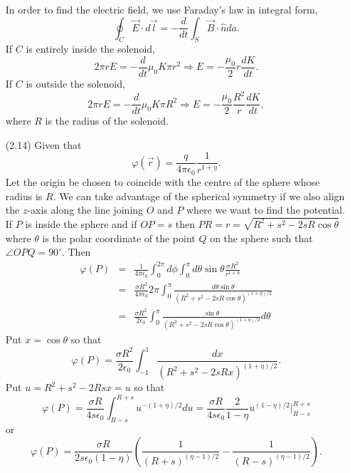\documentclass{article}
\newcommand{\un}{\hat{n}}
\begin{document}
\begin{enumerate}
In order to find the electric field, we use Faraday's law in integral form,
\[
\oint_C \vec{E}\cdot d\vec{l} = -\frac{d}{dt}\int_S \vec{B}\cdot\un da.
\]
If $C$ is entirely inside the solenoid, 
\[
2\pi r E = -\frac{d}{dt}\mu_0 K \pi r^2 \Rightarrow E = -\frac{\mu_0}{2}r \frac{dK}{dt}.
\]
If $C$ is outside the solenoid,
\[
2\pi r E = -\frac{d}{dt}\mu_0 K \pi R^2 \Rightarrow E = -\frac{\mu_0}{2}\frac{R^2}{r} \frac{dK}{dt},
\]
where $R$ is the radius of the solenoid.

\item[(2.14)] Given that
\[
\varphi(\vec{r}) = \frac{q}{4\pi\epsilon_0}\frac{1}{r^{1+\eta}}.
\]
Let the origin be chosen to coincide with the centre of the sphere whose radius is $R$. We can take advantage of the
spherical symmetry if we also align the $z$-axis along the line joining $O$ and $P$ where we want to find the potential. If $P$
is inside the sphere and if $OP = s$ then $PR = r = \sqrt{R^2 + s^2 - 2sR\cos\theta}$ where $\theta$ is the polar coordinate of
the point $Q$ on the sphere such that $\angle OPQ = 90^\circ$. Then
\begin{eqnarray*}
\varphi(P) &=& \frac{1}{4\pi\epsilon_0}\int_0^{2\pi}d\phi \int_0^\pi d\theta \sin\theta\frac{\sigma R^2}{r^{1+\eta}} \\
 &=& \frac{\sigma R^2}{4\pi\epsilon_0} 2\pi \int_0^\pi \frac{d\theta \sin\theta}{(R^2 + s^2 - 2sR\cos\theta)^{(1 + \eta)/2}} \\
 &=& \frac{\sigma R^2}{2\epsilon_0} \int_0^\pi \frac{\sin\theta}{(R^2 + s^2 - 2sR\cos\theta)^{(1 + \eta)/2}}d\theta
\end{eqnarray*}
Put $x = \cos\theta$ so that
\[
\varphi(P) = \frac{\sigma R^2}{2\epsilon_0}\int_{-1}^1 \frac{dx}{(R^2 + s^2 - 2sRx)^{(1 + \eta)/2}}.
\]
Put $u = R^2 + s^2 - 2Rsx = u$ so that
\[
\varphi(P) = \frac{\sigma R}{4s\epsilon_0}\int_{R-s}^{R+s} u^{-(1 + \eta)/2}du = \frac{\sigma R}{4s\epsilon_0}\frac{2}{1 - \eta}
u^{(1 - \eta)/2}\Big|_{R-s}^{R+s}
\]
or
\[
\varphi(P) = \frac{\sigma R}{2s\epsilon_0(1 - \eta)}\left(\frac{1}{(R+s)^{(\eta - 1)/2}} - \frac{1}{(R-s)^{(\eta - 1)/2}}\right).
\]
\end{enumerate}
\end{document}
